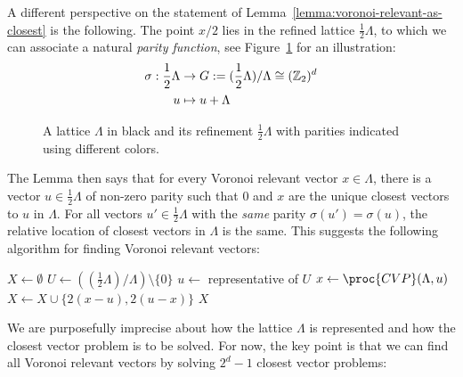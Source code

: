 A different perspective on the statement of Lemma~\ref{lemma:voronoi-relevant-as-closest}
is the following.
The point $x/2$ lies in the refined lattice $\frac{1}{2} \Lambda$,
to which we can associate a natural \emph{parity function},
see Figure~\ref{fig:lattice-refinement-parity} for an illustration:
\begin{align*}
  \sigma : \frac{1}{2} \Lambda &\to G := (\frac{1}{2} \Lambda) / \Lambda \cong (\mathbb{Z}_2)^d \\
                   u &\mapsto u + \Lambda
\end{align*}%
\begin{figure}
  \begin{center}
  \end{center}
  \caption{A lattice $\Lambda$ in black and its refinement $\frac{1}{2} \Lambda$
    with parities indicated using different colors.}
  \label{fig:lattice-refinement-parity}
\end{figure}%
The Lemma then says that for every Voronoi relevant vector $x \in \Lambda$,
there is a vector $u \in \frac{1}{2} \Lambda$ of non-zero parity
such that $0$ and $x$ are the unique closest vectors to $u$ in $\Lambda$.
For all vectors $u' \in \frac{1}{2} \Lambda$ with the \emph{same} parity $\sigma(u') = \sigma(u)$,
the relative location of closest vectors in $\Lambda$ is the same.
This suggests the following algorithm for finding Voronoi relevant vectors:
\begin{codebox}
  \li $X \gets \emptyset$
  \li \For $U \gets \left((\frac{1}{2} \Lambda) / \Lambda\right) \setminus \{ 0 \}$
  \li \Do $u \gets$ representative of $U$
  \li     $x \gets \proc{CVP}(\Lambda, u)$
  \li     $X \gets X \cup \{ 2(x - u), 2(u - x) \}$
  \li \Return $X$
\end{codebox}
We are purposefully imprecise about how the lattice $\Lambda$ is represented
and how the closest vector problem is to be solved.
For now, the key point is that we can find all Voronoi relevant vectors
by solving $2^d - 1$ closest vector problems:

